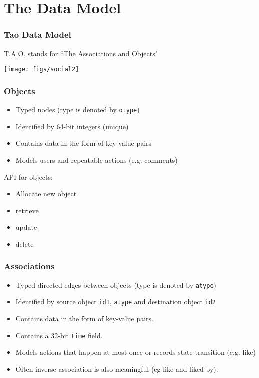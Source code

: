 \section{The Data Model}

\begin{frame}
\frametitle{Tao Data Model}
 	T.A.O. stands for ``The Associations and Objects"
 	\begin{center}
 	\texttt{[image: figs/social2]}		
 	\end{center}
\end{frame}

\begin{frame}[fragile]
\frametitle{Objects}
\begin{itemize}
	\item Typed nodes (type is denoted by \verb|otype|)
	\item Identified by 64-bit integers (unique) 
	\item Contains data in the form of key-value pairs
	\item Models users and repeatable actions (e.g. comments)
\end{itemize}
API for objects:
\begin{itemize}
	\item Allocate new object 
	\item retrieve
	\item update
	\item delete
\end{itemize}
\end{frame}


\begin{frame}[fragile]
\frametitle{Associations}
    \begin{itemize}
	\item Typed directed edges between objects (type is denoted by \verb!atype!)
	\item Identified by source object \verb!id1!, \verb!atype! and destination object \verb!id2!
	\item Contains data in the form of key-value pairs.
	\item Contains a 32-bit \verb!time! field.
	\item Models actions that happen at most once or records state transition (e.g. like)
	\item Often inverse association is also meaningful (eg like and liked by).
\end{itemize}
\end{frame}

